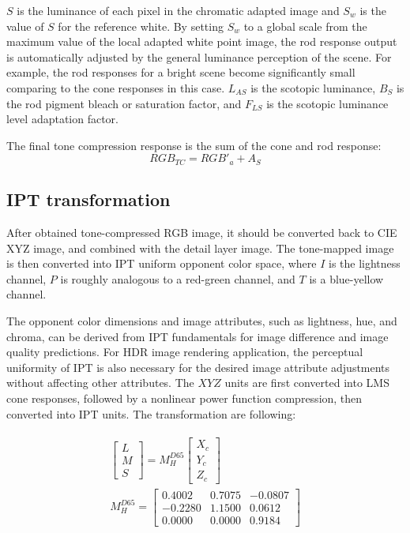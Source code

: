 \documentclass[10pt,twocolumn,letterpaper]{article}
\begin{document}
$S$ is the luminance of each pixel in the chromatic adapted image and $S_w$ is the value of $S$ for the reference white. By setting $S_w$ to a global scale from the maximum value of the local adapted white point image, the rod response output is automatically adjusted by the general luminance perception of the scene. For example, the rod responses for a bright scene become significantly small comparing to the cone responses in this case. $L_{AS}$ is the scotopic luminance, $B_S$ is the rod pigment bleach or saturation factor, and $F_{LS}$ is the scotopic luminance level adaptation factor.

The final tone compression response is the sum of the cone and rod response:
\begin{equation}
	RGB_{TC} = RGB'_a+A_S
\end{equation}

\subsection{IPT transformation}
\label{sec:parte}
After obtained tone-compressed RGB image, it should be converted back to CIE XYZ image, and combined with the detail layer image. The tone-mapped image is then converted into IPT uniform opponent color space, where $I$ is the lightness channel, $P$ is roughly analogous to a red-green channel, and $T$ is a blue-yellow channel.

The opponent color dimensions and image attributes, such as lightness, hue, and chroma, can be derived from IPT fundamentals for image difference and image quality predictions. For HDR image rendering application, the perceptual uniformity of IPT is also necessary for the desired image attribute adjustments without affecting other attributes. The $XYZ$ units are first converted into LMS cone responses, followed by a nonlinear power function compression, then converted into IPT units. The transformation are following:

\begin{align}
\begin{aligned}
	\left[
		\begin{array}{c}
		L\\
		M\\
		S
		\end{array}
	\right]
	= M_{H}^{D65}
	\left[
		\begin{array}{c}
		X_c\\
		Y_c\\
		Z_c
		\end{array}
	\right]\\
	M_{H}^{D65} = 
	\left[
		\begin{array}{ccc}
		0.4002&0.7075&-0.0807\\
		-0.2280&1.1500&0.0612\\
		0.0000&0.0000&0.9184
		\end{array}
	\right]
\end{aligned}
\end{align}
\end{document}
